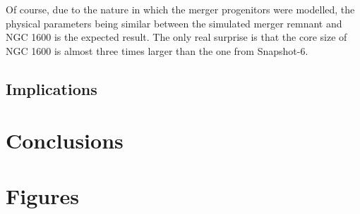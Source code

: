 \documentclass[english, oneside]{HYgradu}
\begin{document}
Of course, due to the nature in which the merger progenitors were modelled, the physical parameters being similar between the simulated merger remnant and NGC 1600 is the expected result. The only real surprise is that the core size of NGC 1600 is almost three times larger than the one from Snapshot-6.


\section{Implications}


\chapter{Conclusions}

\appendix

\chapter{Figures}
\end{document}
